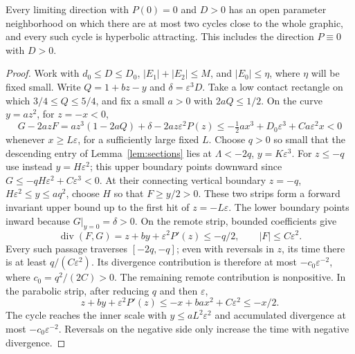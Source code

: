 \begin{proposition}\label{prop:positive-forcing}
Every limiting direction with $P(0)=0$ and $D>0$ has an open
parameter neighborhood on which there are at most two cycles close to
the whole graphic, and every such cycle is hyperbolic attracting. This
includes the direction $P\equiv0$ with $D>0$.
\end{proposition}
\begin{proof}
Work with $d_0\le D\le D_0$, $|E_1|+|E_2|\le M$, and
$|E_0|\le\eta$, where $\eta$ will be fixed small. Write
$Q=1+bz-y$ and $\delta=\varepsilon^3D$. Take a low contact
rectangle on which $3/4\le Q\le5/4$, and fix a small $a>0$
with $2aQ\le1/2$. On the curve $y=az^2$, for $z=-x<0$,
\begin{equation}\label{eq:forcing-negative-parabola}
 G-2azF=az^3(1-2aQ)+\delta-2az\varepsilon^2P(z)
       \le-\tfrac12 ax^3+D_0\varepsilon^3+Ca\varepsilon^2x<0
\end{equation}
whenever $x\ge L\varepsilon$, for a sufficiently large fixed $L$.
Choose $q>0$ so small that the descending entry of
Lemma~\ref{lem:sections} lies at $\Lambda<-2q$, $y=K\varepsilon^3$.
For $z\le-q$ use instead $y=H\varepsilon^2$; this upper boundary
points downward since $G\le-qH\varepsilon^2+C\varepsilon^3<0$.
At their connecting
vertical boundary $z=-q$, $H\varepsilon^2\le y\le aq^2$,
choose $H$ so that $F\ge y/2>0$. These two strips form a
forward invariant upper bound up to the first hit of $z=-L\varepsilon$.
The lower boundary points inward because $G|_{y=0}=\delta>0$.
On the remote strip, bounded coefficients give
\begin{equation}\label{eq:remote-attraction}
 \operatorname{div}(F,G)=z+by+\varepsilon^2P'(z)\le-q/2,
 \qquad |F|\le C\varepsilon^2.
\end{equation}
Every such passage traverses $[-2q,-q]$; even with reversals in $z$,
its time there is at least $q/(C\varepsilon^2)$. Its divergence
contribution is therefore at most $-c_0\varepsilon^{-2}$, where
$c_0=q^2/(2C)>0$. The remaining remote contribution is nonpositive.
In the parabolic strip, after reducing $q$ and then $\varepsilon$,
\[
 z+by+\varepsilon^2P'(z)\le-x+bax^2+C\varepsilon^2\le-x/2.
\]
The cycle reaches the inner scale with $y\le aL^2\varepsilon^2$ and
accumulated divergence at most $-c_0\varepsilon^{-2}$.
Reversals on the negative side only increase the time with negative
divergence.


\end{proof}
